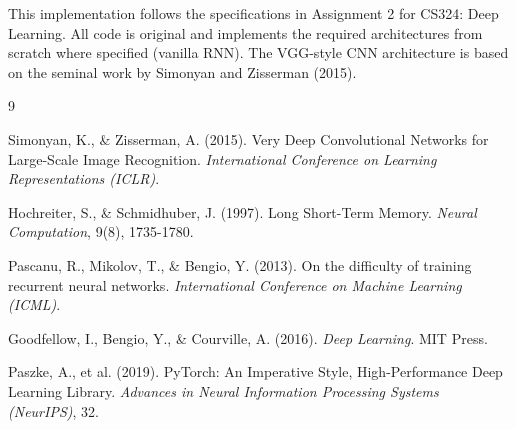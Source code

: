 \documentclass[11pt,a4paper]{article}
\begin{document}
This implementation follows the specifications in Assignment 2 for CS324: Deep Learning. All code is original and implements the required architectures from scratch where specified (vanilla RNN). The VGG-style CNN architecture is based on the seminal work by Simonyan and Zisserman (2015).

\begin{thebibliography}{9}

Simonyan, K., \& Zisserman, A. (2015). Very Deep Convolutional Networks for Large-Scale Image Recognition. \textit{International Conference on Learning Representations (ICLR)}.

Hochreiter, S., \& Schmidhuber, J. (1997). Long Short-Term Memory. \textit{Neural Computation}, 9(8), 1735-1780.

Pascanu, R., Mikolov, T., \& Bengio, Y. (2013). On the difficulty of training recurrent neural networks. \textit{International Conference on Machine Learning (ICML)}.

Goodfellow, I., Bengio, Y., \& Courville, A. (2016). \textit{Deep Learning}. MIT Press.

Paszke, A., et al. (2019). PyTorch: An Imperative Style, High-Performance Deep Learning Library. \textit{Advances in Neural Information Processing Systems (NeurIPS)}, 32.

\end{thebibliography}
\end{document}

